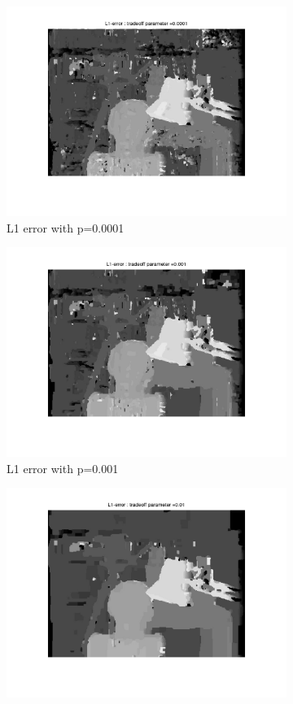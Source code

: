 \documentclass[fleqn]{article}
\begin{document}
\begin{figure}[!ht]
\begin{subfigure}{0.5\textwidth}
\includegraphics[scale=0.2]{./pics/tsukuba_L1_error_p=0.0001.jpg}
\caption{L1 error with p=0.0001}
\end{subfigure}
 \begin{subfigure}{0.5\textwidth}
\includegraphics[scale=0.2]{./pics/tsukuba_L1_error_p=0.001.jpg}
\caption{L1 error with p=0.001}
\end{subfigure}
 \begin{subfigure}{0.5\textwidth}
\includegraphics[scale=0.2]{./pics/tsukuba_L1_error_p=0.01.jpg}

\end{subfigure}
\end{figure}
\end{document}
